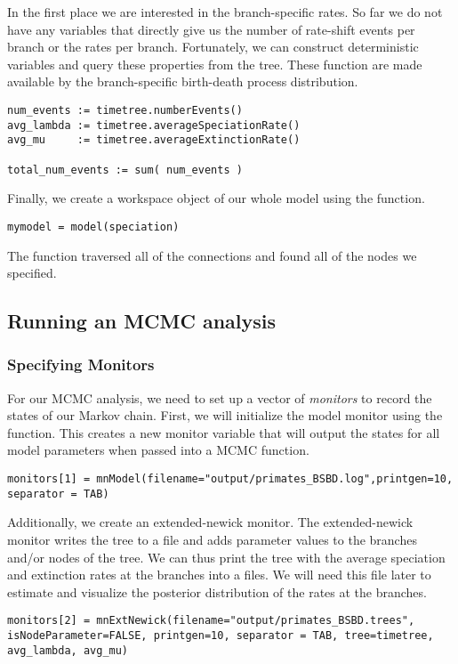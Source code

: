 In the first place we are interested in the branch-specific rates.
So far we do not have any variables that directly give us the number of rate-shift events per branch or the rates per branch.
Fortunately, we can construct deterministic variables and query these properties from the tree.
These function are made available by the branch-specific birth-death process distribution.
{\tt \begin{snugshade*}
\begin{lstlisting}
num_events := timetree.numberEvents()
avg_lambda := timetree.averageSpeciationRate()
avg_mu     := timetree.averageExtinctionRate()

total_num_events := sum( num_events )
\end{lstlisting}
\end{snugshade*}}


Finally, we create a workspace object of our whole model using the  function. 
{\tt \begin{snugshade*}
\begin{lstlisting}
mymodel = model(speciation)
\end{lstlisting}
\end{snugshade*}}

The  function traversed all of the connections and found all of the nodes we specified. 


\subsection{Running an MCMC analysis}

\subsubsection{Specifying Monitors}

For our MCMC analysis, we need to set up a vector of \textit{monitors} to record the states of our Markov chain. 
First, we will initialize the model monitor using the  function. This creates a new monitor variable that will output the states for all model parameters when passed into a MCMC function. 
{\tt \begin{snugshade*}
\begin{lstlisting}
monitors[1] = mnModel(filename="output/primates_BSBD.log",printgen=10, separator = TAB)
\end{lstlisting}
\end{snugshade*}}

Additionally, we create an extended-newick monitor.
The extended-newick monitor writes the tree to a file and adds parameter values to the branches and/or nodes of the tree.
We can thus print the tree with the average speciation and extinction rates at the branches into a files.
We will need this file later to estimate and visualize the posterior distribution of the rates at the branches.
{\tt \begin{snugshade*}
\begin{lstlisting}
monitors[2] = mnExtNewick(filename="output/primates_BSBD.trees", isNodeParameter=FALSE, printgen=10, separator = TAB, tree=timetree, avg_lambda, avg_mu)
\end{lstlisting}
\end{snugshade*}}

